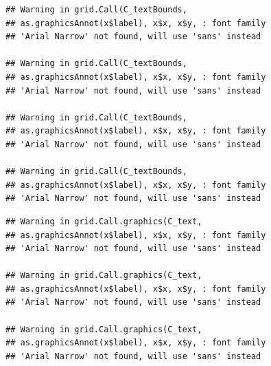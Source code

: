\documentclass[]{krantz}
\begin{document}
\begin{verbatim}
## Warning in grid.Call(C_textBounds,
## as.graphicsAnnot(x$label), x$x, x$y, : font family
## 'Arial Narrow' not found, will use 'sans' instead

## Warning in grid.Call(C_textBounds,
## as.graphicsAnnot(x$label), x$x, x$y, : font family
## 'Arial Narrow' not found, will use 'sans' instead

## Warning in grid.Call(C_textBounds,
## as.graphicsAnnot(x$label), x$x, x$y, : font family
## 'Arial Narrow' not found, will use 'sans' instead

## Warning in grid.Call(C_textBounds,
## as.graphicsAnnot(x$label), x$x, x$y, : font family
## 'Arial Narrow' not found, will use 'sans' instead
\end{verbatim}

\begin{verbatim}
## Warning in grid.Call.graphics(C_text,
## as.graphicsAnnot(x$label), x$x, x$y, : font family
## 'Arial Narrow' not found, will use 'sans' instead

## Warning in grid.Call.graphics(C_text,
## as.graphicsAnnot(x$label), x$x, x$y, : font family
## 'Arial Narrow' not found, will use 'sans' instead

## Warning in grid.Call.graphics(C_text,
## as.graphicsAnnot(x$label), x$x, x$y, : font family
## 'Arial Narrow' not found, will use 'sans' instead
\end{verbatim}
\end{document}

